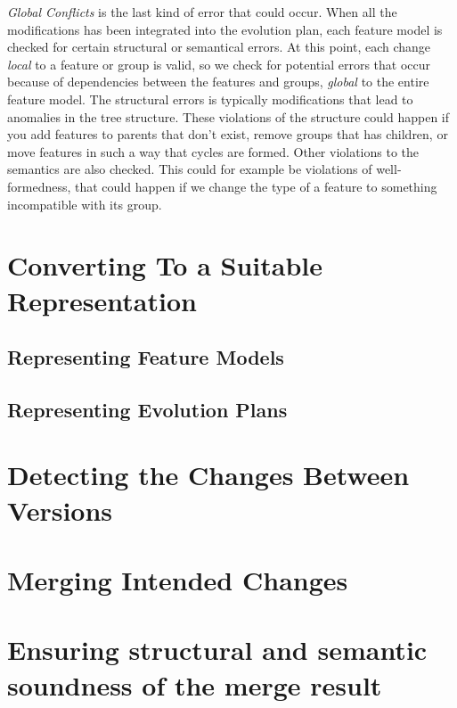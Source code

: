 \documentclass[a4paper,english]{ifimaster}
\begin{document}
\textit{Global Conflicts} is the last kind of error that could occur. When all the modifications has been integrated into the evolution plan, each feature model is checked for certain structural or semantical errors. At this point, each change \textit{local} to a feature or group is valid, so we check for potential errors that occur because of dependencies between the features and groups, \textit{global} to the entire feature model. The structural errors is typically modifications that lead to anomalies in the tree structure. These violations of the structure could happen if you add features to parents that don't exist, remove groups that has children, or move features in such a way that cycles are formed. Other violations to the semantics are also checked. This could for example be violations of well-formedness, that could happen if we change the type of a feature to something incompatible with its group.

\section{Converting To a Suitable Representation}%
\label{sec:converting_to_a_suitable_representation}

\subsection{Representing Feature Models}%
\label{sub:representing_feature_models}

\subsection{Representing Evolution Plans}%
\label{sub:representing_evolution_plans}

\section{Detecting the Changes Between Versions}%
\label{sec:detecting_the_changes_between_versions}

\section{Merging Intended Changes}%
\label{sec:merging_intended_changes}

\section{Ensuring structural and semantic soundness of the merge result}%
\label{sec:ensuring_structural_and_semantic_soundness_of_merge_result}
\end{document}
